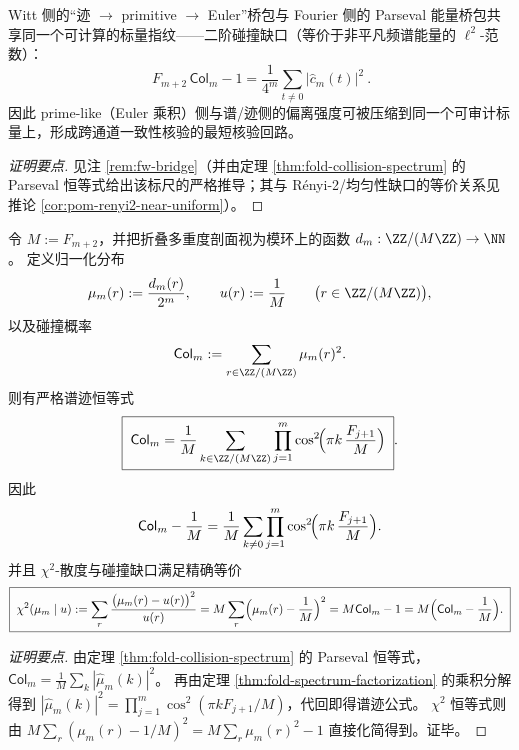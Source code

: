 \begin{conclusion}\label{con:xi-collision-gap-ghost-yardstick}
Witt 侧的“迹 \(\to\) primitive \(\to\) Euler”桥包与 Fourier 侧的 Parseval 能量桥包共享同一个可计算的标量指纹——二阶碰撞缺口（等价于非平凡频谱能量的 \(\ell^2\)-范数）：
\[
\boxed{\ F_{m+2}\,\mathsf{Col}_m-1=\frac{1}{4^m}\sum_{t\ne 0}\bigl|\widehat c_m(t)\bigr|^2\ }.
\]
因此 prime-like（Euler 乘积）侧与谱/迹侧的偏离强度可被压缩到同一个可审计标量上，形成跨通道一致性核验的最短核验回路。
\end{conclusion}
\begin{proof}[证明要点]
见注 \ref{rem:fw-bridge}（并由定理 \ref{thm:fold-collision-spectrum} 的 Parseval 恒等式给出该标尺的严格推导；其与 Rényi-2/均匀性缺口的等价关系见推论 \ref{cor:pom-renyi2-near-uniform}）。
\end{proof}

\begin{conclusion}\label{con:xi-fold-collision-spectral-trace-parseval}
令 \(M:=F_{m+2}\)，并把折叠多重度剖面视为模环上的函数
\(
d_m:\ZZ/(M\ZZ)\to\NN
\)。
定义归一化分布
\[
\mu_m(r):=\frac{d_m(r)}{2^m},
\qquad
u(r):=\frac{1}{M}\qquad\bigl(r\in\ZZ/(M\ZZ)\bigr),
\]
以及碰撞概率
\[
\mathsf{Col}_m:=\sum_{r\in\ZZ/(M\ZZ)}\mu_m(r)^2.
\]
则有严格谱迹恒等式
\[
\boxed{\;
\mathsf{Col}_m
=\frac{1}{M}\sum_{k\in\ZZ/(M\ZZ)}
\prod_{j=1}^{m}\cos^2\!\Bigl(\pi k\,\frac{F_{j+1}}{M}\Bigr)\; }.
\]
因此
\[
\mathsf{Col}_m-\frac1M
=\frac{1}{M}\sum_{k\ne 0}
\prod_{j=1}^{m}\cos^2\!\Bigl(\pi k\,\frac{F_{j+1}}{M}\Bigr).
\]
并且 \(\chi^2\)-散度与碰撞缺口满足精确等价
\[
\boxed{\;
\chi^2(\mu_m\mid u)
:=\sum_{r}\frac{\bigl(\mu_m(r)-u(r)\bigr)^2}{u(r)}
=M\sum_{r}\Bigl(\mu_m(r)-\frac1M\Bigr)^2
=M\mathsf{Col}_m-1
=M\Bigl(\mathsf{Col}_m-\frac1M\Bigr).\;}
\]
\end{conclusion}
\begin{proof}[证明要点]
由定理 \ref{thm:fold-collision-spectrum} 的 Parseval 恒等式，
\(
\mathsf{Col}_m=\frac{1}{M}\sum_k|\widehat\mu_m(k)|^2
\)。
再由定理 \ref{thm:fold-spectrum-factorization} 的乘积分解得到
\(
|\widehat\mu_m(k)|^2=\prod_{j=1}^m\cos^2(\pi kF_{j+1}/M)
\)，代回即得谱迹公式。
\(\chi^2\) 恒等式则由
\(
M\sum_r(\mu_m(r)-1/M)^2=M\sum_r\mu_m(r)^2-1
\)
直接化简得到。证毕。
\end{proof}

